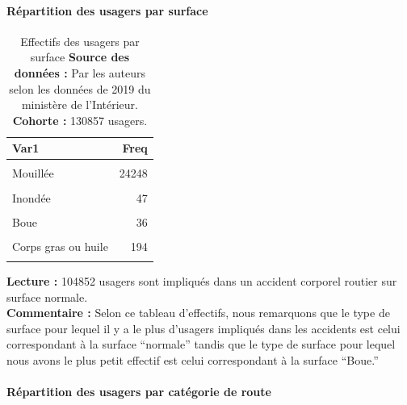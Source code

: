 \documentclass[french,]{tp}
\let\oldparagraph\paragraph
\renewcommand{\paragraph}[1]{\oldparagraph{#1}\mbox{}}
\begin{document}
\hypertarget{ruxe9partition-des-usagers-par-surface}{%
\paragraph{Répartition des usagers par surface}\label{ruxe9partition-des-usagers-par-surface}}





\begin{table}[H]

\caption{\label{tab:tablesurf}Effectifs des usagers par surface
\textbf{Source des données :} Par les auteurs selon les données de 2019 du ministère de l'Intérieur.\\
\textbf{Cohorte :} 130857 usagers.\\}
\centering
\begin{tabular}[t]{lr}
\toprule
\textbf{Var1} & \textbf{Freq}\\
\midrule
\cellcolor{gray!6}{Normale} & \cellcolor{gray!6}{104852}\\
Mouillée & 24248\\
\cellcolor{gray!6}{Flaques} & \cellcolor{gray!6}{228}\\
Inondée & 47\\
\cellcolor{gray!6}{Enneigée} & \cellcolor{gray!6}{251}\\
\addlinespace
Boue & 36\\
\cellcolor{gray!6}{Verglacée} & \cellcolor{gray!6}{427}\\
Corps gras ou huile & 194\\
\cellcolor{gray!6}{Autre} & \cellcolor{gray!6}{574}\\
\bottomrule
\end{tabular}
\end{table}

\textbf{Lecture :} 104852 usagers sont impliqués dans un accident corporel routier sur surface normale.\\
\textbf{Commentaire :} Selon ce tableau d'effectifs, nous remarquons que le type de surface pour lequel il y a le plus d'usagers impliqués dans les accidents est celui correspondant à la surface ``normale'' tandis que le type de surface pour lequel nous avons le plus petit effectif est celui correspondant à la surface ``Boue.''

\hypertarget{ruxe9partition-des-usagers-par-catuxe9gorie-de-route}{%
\paragraph{Répartition des usagers par catégorie de route}\label{ruxe9partition-des-usagers-par-catuxe9gorie-de-route}}
\end{document}
